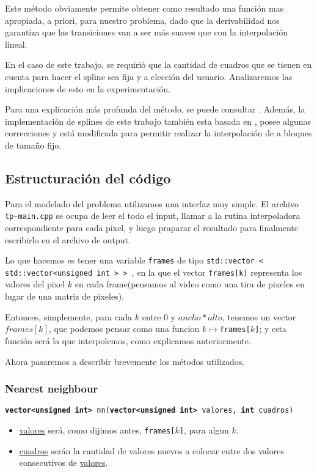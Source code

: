 Este método obviamente permite obtener como resultado una función mas apropiada, a priori, para nuestro problema, dado que la derivabilidad nos garantiza que las transiciones van a ser más suaves que con la interpolación lineal.

En el caso de este trabajo, se requirió que la cantidad de cuadros que se tienen en cuenta para hacer el spline sea fija y a elección del usuario. Analizaremos las implicaciones de esto en la experimentación.

Para una explicación más profunda del método, se puede consultar \cite{burden}. Además, la implementación de splines de este trabajo también esta basada en \cite{burden}, posee algunas correcciones y está modificada para permitir realizar la interpolación de a bloques de tamaño fijo.


\subsection{Estructuración del código}

Para el modelado del problema utilizamos una interfaz muy simple. El archivo \texttt{tp-main.cpp} se ocupa de leer el todo el input, llamar a la rutina interpoladora correspondiente para cada pixel, y luego praparar el resultado para finalmente escribirlo en el archivo de output.

Lo que hacemos es tener una variable \texttt{frames} de tipo \texttt{std::vector < std::vector<unsigned int > {} > }, en la que el vector \texttt{frames[k]} representa los valores del pixel $k$ en cada frame(pensamos al video como una tira de pixeles en lugar de una matriz de pixeles).


Entonces, simplemente, para cada $k$ entre 0 y $ancho * alto$, tenemos un vector $frames[k]$, que podemos pensar como una funcion $ k \mapsto $\texttt{frames[$k$]}; y esta función será la que interpolemos, como explicamos anteriormente.

Ahora pasaremos a describir brevemente los métodos utilizados.


\subsubsection{Nearest neighbour}
\texttt{\textbf{vector<unsigned int>} nn(\textbf{vector<unsigned int>} valores, \textbf{int} cuadros)}

\begin{itemize}
    \item  \underline{valores} será, como dijimos antes, \texttt{frames[$k$]}, para algun $k$.
    \item \underline{cuadros} serán la cantidad de valores nuevos a colocar entre dos valores consecutivos de \underline{valores}.
\end{itemize}

